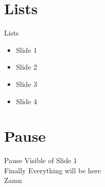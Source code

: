 \documentclass{beamer}
\begin{document}
	\section{Lists}
	\begin{frame}{Lists}
		\begin{itemize}
			\item<1-> Slide 1
			\item<2-> Slide 2
			\item<3-> Slide 3
			\item<4-> Slide 4
		\end{itemize}
	\end{frame}
	\newpage
	\section{Pause}
	\begin{frame}{Pause}
		Visible of Slide 1 \pause \\
		Finally Everything will be here \\
		\alert{Zamn}
	\end{frame}
\end{document}
